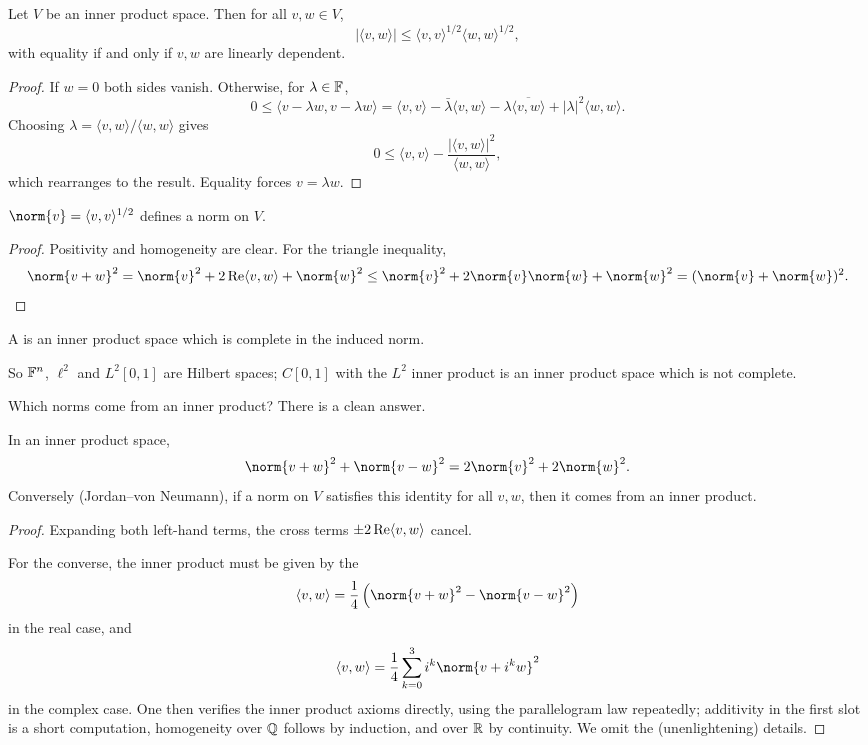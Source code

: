 \documentclass[a4paper]{scrartcl}
\newcommand{\ip}[2]{\langle #1, #2 \rangle}
\begin{document}
\begin{proposition}
	Let $V$ be an inner product space. Then for all $v, w \in V$,
	$$|\ip{v}{w}| \leq \ip{v}{v}^{1/2}\ip{w}{w}^{1/2},$$
	with equality if and only if $v, w$ are linearly dependent.
\end{proposition}

\begin{proof}
	If $w = 0$ both sides vanish. Otherwise, for $\lambda \in \mathbb{F}$,
	$$0 \leq \ip{v - \lambda w}{v - \lambda w} = \ip{v}{v} - \bar\lambda\ip{v}{w} - \lambda \overline{\ip{v}{w}} + |\lambda|^2 \ip{w}{w}.$$
	Choosing $\lambda = \ip{v}{w}/\ip{w}{w}$ gives
	$$0 \leq \ip{v}{v} - \frac{|\ip{v}{w}|^2}{\ip{w}{w}},$$
	which rearranges to the result. Equality forces $v = \lambda w$.
\end{proof}

\begin{corollary}
	$\norm{v} = \ip{v}{v}^{1/2}$ defines a norm on $V$.
\end{corollary}

\begin{proof}
	Positivity and homogeneity are clear. For the triangle inequality,
	$$\norm{v+w}^2 = \norm{v}^2 + 2\re\ip{v}{w} + \norm{w}^2 \leq \norm{v}^2 + 2\norm{v}\norm{w} + \norm{w}^2 = (\norm{v}+\norm{w})^2. \qedhere$$
\end{proof}

\begin{definition}
	A  is an inner product space which is complete in the induced norm.
\end{definition}

So $\mathbb{F}^n$, $\ell^2$ and $L^2[0,1]$ are Hilbert spaces; $C[0,1]$ with the $L^2$ inner product is an inner product space which is not complete.

Which norms come from an inner product? There is a clean answer.

\begin{proposition}
	In an inner product space,
	$$\norm{v+w}^2 + \norm{v-w}^2 = 2\norm{v}^2 + 2\norm{w}^2.$$
	Conversely (Jordan--von Neumann), if a norm on $V$ satisfies this identity for all $v,w$, then it comes from an inner product.
\end{proposition}

\begin{proof}
	Expanding both left-hand terms, the cross terms $\pm 2\re\ip{v}{w}$ cancel.

	For the converse, the inner product must be given by the 
	$$\ip{v}{w} = \frac14\left( \norm{v+w}^2 - \norm{v-w}^2 \right)$$
	in the real case, and
	$$\ip{v}{w} = \frac14 \sum_{k=0}^{3} i^k \norm{v + i^k w}^2$$
	in the complex case. One then verifies the inner product axioms directly, using the parallelogram law repeatedly; additivity in the first slot is a short computation, homogeneity over $\mathbb{Q}$ follows by induction, and over $\mathbb{R}$ by continuity. We omit the (unenlightening) details.
\end{proof}
\end{document}
